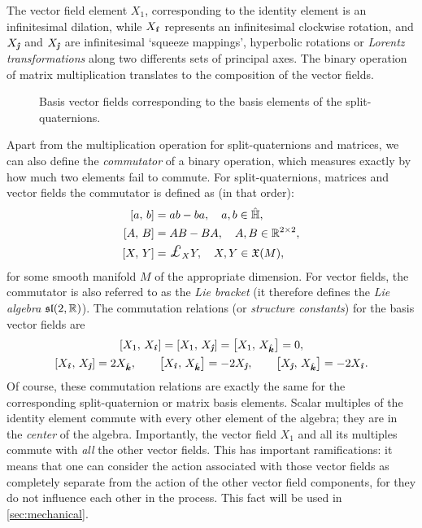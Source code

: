 The vector field element $X_1$, corresponding to the identity element is an infinitesimal dilation, while $X_{\quati}$ represents an infinitesimal clockwise rotation, and $X_{\quatj}$ and $X_{\quatj}$ are infinitesimal `squeeze mappings', hyperbolic rotations or \emph{Lorentz transformations} along two differents sets of principal axes. The binary operation of matrix multiplication translates to the composition of the vector fields.
\begin{figure}[ht!]
    \centering
    
    \caption{Basis vector fields corresponding to the basis elements of the split-quaternions.}
    \label{fig:basis_vf}
\end{figure}

Apart from the multiplication operation for split-quaternions and matrices, we can also define the \emph{commutator} of a binary operation, which measures exactly by how much two elements fail to commute. For split-quaternions, matrices and vector fields the commutator is defined as (in that order): 
\begin{equation}
    \begin{split}
        \liebr{a}{b} &= ab - ba,\quad a, b \in \spquaternions, \\
        \liebr{A}{B} &= AB - BA,\quad A, B \in \real^{2\times 2}, \\
        \liebr{X}{Y} &= \lied{X}{Y},\quad X,Y\in \vfields{M},
    \end{split}
\end{equation}
for some smooth manifold $M$ of the appropriate dimension. For vector fields, the commutator is also referred to as the \emph{Lie bracket} (it therefore defines the \emph{Lie algebra} $\slalg{2}{\real}$). The commutation relations (or \emph{structure constants}) for the basis vector fields are \cite{Schuller2014}
\begin{gather}
    \liebr{X_1}{X_{\quati}} = \liebr{X_1}{X_{\quatj}} = \liebr{X_1}{X_{\quatk}} = 0, \\
    \liebr{X_{\quati}}{X_{\quatj}} = 2X_{\quatk}, \qquad  
    \liebr{X_{\quati}}{X_{\quatk}} = -2X_{\quatj}, \qquad
    \liebr{X_{\quatj}}{X_{\quatk}} = -2X_{\quati}.
\end{gather}
Of course, these commutation relations are exactly the same for the corresponding split-quaternion or matrix basis elements. Scalar multiples of the identity element commute with every other element of the algebra; they are in the \emph{center} of the algebra. Importantly, the vector field $X_1$ and all its multiples commute with 
\emph{all} the other vector fields. This has important ramifications: it means that one can consider the action associated with those vector fields as completely separate from the action of the other vector field components, for they do not influence each other in the process. This fact will be used in \cref{sec:mechanical}.

